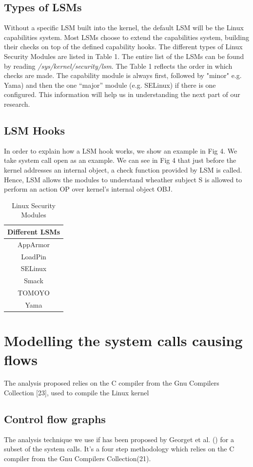 \subsection{Types of LSMs}
Without a specific LSM built into the kernel, the default LSM will be the Linux capabilities system. Most LSMs choose to extend the capabilities system, building their checks on top of the defined capability hooks.
\vskip 0.1in
The different types of Linux Security Modules are listed in Table 1. The entire list of the LSMs can be found by reading \textit{/sys/kernel/security/lsm}. The Table 1 reflects the order in which checks are made. The capability module is always first, followed by "minor" e.g. Yama) and then the one “major” module (e.g. SELinux) if there is one configured. This information will help us in understanding the next part of our research. 
\subsection{LSM Hooks}
In order to explain how a LSM hook works, we show an example in Fig 4. We take system call open as an example. We can see in Fig 4 that just before the kernel addresses an internal object, a check function provided by LSM is called. Hence, LSM allows the modules to understand wheather subject S is allowed to perform an action OP over kernel's internal object OBJ.


\begin{table}[ht]
	\caption{Linux Security Modules}
	\centering
	\begin{tabular}{c}
		\hline\hline 
		Different LSMs \\
		\hline
		AppArmor \\
		LoadPin  \\
		SELinux  \\
		Smack   \\
		TOMOYO \\
		Yama \\
	\end{tabular}	
\end{table}


\section{Modelling the system calls causing flows}
The analysis proposed relies on the C compiler from the
Gnu Compilers Collection [23], used to compile the Linux
kernel

\subsection{Control flow graphs}
The analysis technique we use if has been proposed by Georget et al. () for a subset of the system calls. It's a four step methodology which relies on the C compiler from the Gnu Compilers Collection(21). 

